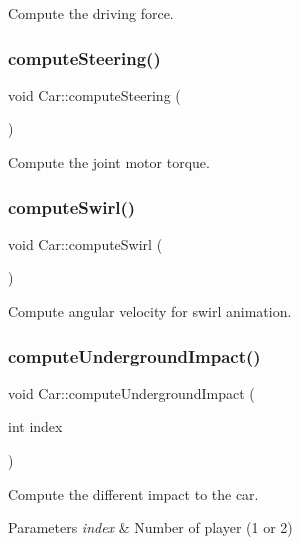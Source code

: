 Compute the driving force. 

\mbox{\label{class_car_a068bac1244634e89b1ce7d503b99e276}} 
\subsubsection{\texorpdfstring{computeSteering()}{computeSteering()}}
{\footnotesize\ttfamily void Car\+::compute\+Steering (\begin{DoxyParamCaption}{ }\end{DoxyParamCaption})}



Compute the joint motor torque. 

\mbox{\label{class_car_aa469a8a2a7fcae7dfce21c436050769b}} 
\subsubsection{\texorpdfstring{computeSwirl()}{computeSwirl()}}
{\footnotesize\ttfamily void Car\+::compute\+Swirl (\begin{DoxyParamCaption}{ }\end{DoxyParamCaption})}



Compute angular velocity for swirl animation. 

\mbox{\label{class_car_aba9518903b2ae2d20891e5bd0ecb675d}} 
\subsubsection{\texorpdfstring{computeUndergroundImpact()}{computeUndergroundImpact()}}
{\footnotesize\ttfamily void Car\+::compute\+Underground\+Impact (\begin{DoxyParamCaption}\item[{int}]{index }\end{DoxyParamCaption})}



Compute the different impact to the car. 


\begin{DoxyParams}{Parameters}
{\em index} & Number of player (1 or 2) \\
\hline
\end{DoxyParams}
\mbox{\label{class_car_afda59d6973be7a6816edf035b688397a}} 
